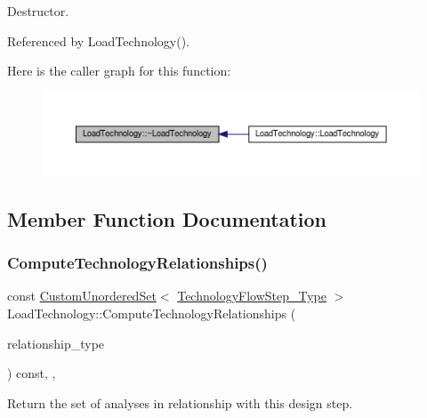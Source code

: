 Destructor. 



Referenced by Load\+Technology().

Here is the caller graph for this function\+:
\nopagebreak
\begin{figure}[H]
\begin{center}
\leavevmode
\includegraphics[width=350pt]{dc/d88/classLoadTechnology_adf6d3c4e1b43fed8a78ea25d760d32c8_icgraph}
\end{center}
\end{figure}


\subsection{Member Function Documentation}
\mbox{\label{classLoadTechnology_a2e08243cc28d6a0a11e258f84c1ec0fa}} 
\subsubsection{\texorpdfstring{Compute\+Technology\+Relationships()}{ComputeTechnologyRelationships()}}
{\footnotesize\ttfamily const \hyperlink{classCustomUnorderedSet}{Custom\+Unordered\+Set}$<$ \hyperlink{technology__flow__step_8hpp_a65208cfec963a7d7def292f9db428292}{Technology\+Flow\+Step\+\_\+\+Type} $>$ Load\+Technology\+::\+Compute\+Technology\+Relationships (\begin{DoxyParamCaption}\item[{const \hyperlink{classDesignFlowStep_a723a3baf19ff2ceb77bc13e099d0b1b7}{Design\+Flow\+Step\+::\+Relationship\+Type}}]{relationship\+\_\+type }\end{DoxyParamCaption}) const\hspace{0.3cm}{\ttfamily [override]}, {\ttfamily [protected]}, {\ttfamily [virtual]}}



Return the set of analyses in relationship with this design step. 


